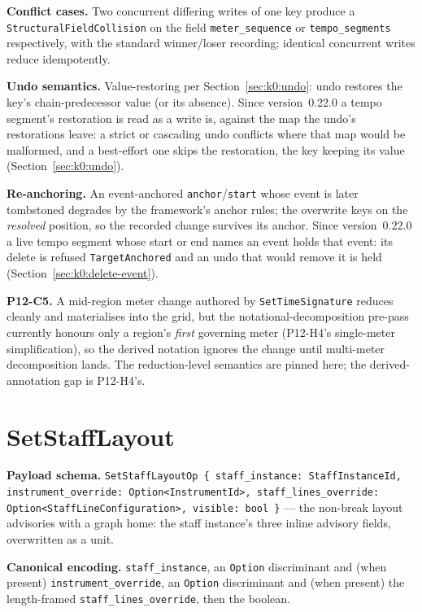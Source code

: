 \documentclass[11pt,letterpaper]{report}
\begin{document}
\textbf{Conflict cases.} Two concurrent differing writes of one key produce a
\texttt{StructuralFieldCollision} on the field \texttt{meter\_sequence} or
\texttt{tempo\_segments} respectively, with the standard winner/loser
recording; identical concurrent writes reduce idempotently.

\textbf{Undo semantics.} Value-restoring per Section~\ref{sec:k0:undo}: undo
restores the key's chain-predecessor value (or its absence). Since
version~0.22.0 a tempo segment's restoration is read as a write is, against
the map the undo's restorations leave: a strict or cascading undo conflicts
where that map would be malformed, and a best-effort one skips the
restoration, the key keeping its value (Section~\ref{sec:k0:undo}).

\textbf{Re-anchoring.} An event-anchored \texttt{anchor}/\texttt{start} whose
event is later tombstoned degrades by the framework's anchor rules; the
overwrite keys on the \emph{resolved} position, so the recorded change
survives its anchor. Since version~0.22.0 a live tempo segment whose start or
end names an event holds that event: its delete is refused
\texttt{TargetAnchored} and an undo that would remove it is held
(Section~\ref{sec:k0:delete-event}).

\begin{openquestion}
\textbf{P12-C5.} A mid-region meter change authored by
\texttt{SetTimeSignature} reduces cleanly and materialises into the grid, but
the notational-decomposition pre-pass currently honours only a region's
\emph{first} governing meter (P12-H4's single-meter simplification), so the
derived notation ignores the change until multi-meter decomposition lands.
The reduction-level semantics are pinned here; the derived-annotation gap is
P12-H4's.
\end{openquestion}

\section{SetStaffLayout}
\label{sec:k0:set-staff-layout}

\textbf{Payload schema.} \texttt{SetStaffLayoutOp \{ staff\_instance:
StaffInstanceId, instrument\_override: Option<InstrumentId>,
staff\_lines\_override: Option<StaffLineConfiguration>, visible: bool \}} ---
the non-break layout advisories with a graph home: the staff instance's three
inline advisory fields, overwritten as a unit.

\textbf{Canonical encoding.} \texttt{staff\_instance}, an \texttt{Option}
discriminant and (when present) \texttt{instrument\_override}, an
\texttt{Option} discriminant and (when present) the length-framed
\texttt{staff\_lines\_override}, then the boolean.
\end{document}
